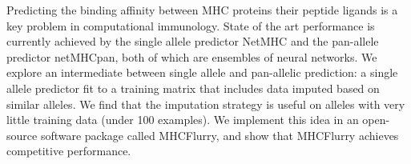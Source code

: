Predicting the binding affinity between MHC proteins their peptide ligands is a key problem in computational immunology. State of the art performance is currently achieved by the single allele predictor NetMHC and the pan-allele predictor netMHCpan, both of which are ensembles of neural networks. We explore an intermediate between single allele and pan-allelic prediction: a single allele predictor fit to a training matrix that includes data imputed based on similar alleles. We find that the imputation strategy is useful on alleles with very little training data (under 100 examples). We implement this idea in an open-source software package called MHCFlurry, and show that MHCFlurry achieves competitive performance.